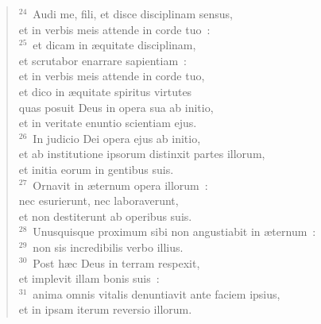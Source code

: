 \begin{flushleft}\begin{verse}${}^{24}$~Audi me, fili, et disce disciplinam sensus,\\ et in verbis meis attende in corde tuo~:\\
${}^{25}$~et dicam in \ae quitate disciplinam,\\ et scrutabor enarrare sapientiam~:\\ et in verbis meis attende in corde tuo,\\ et dico in \ae quitate spiritus virtutes\\ quas posuit Deus in opera sua ab initio,\\ et in veritate enuntio scientiam ejus.\\
${}^{26}$~In judicio Dei opera ejus ab initio,\\ et ab institutione ipsorum distinxit partes illorum,\\ et initia eorum in gentibus suis.\\
${}^{27}$~Ornavit in \ae ternum opera illorum~:\\ nec esurierunt, nec laboraverunt,\\ et non destiterunt ab operibus suis.\\
${}^{28}$~Unusquisque proximum sibi non angustiabit in \ae ternum~:\\
${}^{29}$~non sis incredibilis verbo illius.\\
${}^{30}$~Post h\ae c Deus in terram respexit,\\ et implevit illam bonis suis~:\\
${}^{31}$~anima omnis vitalis denuntiavit ante faciem ipsius,\\ et in ipsam iterum reversio illorum.\end{verse}\end{flushleft}


